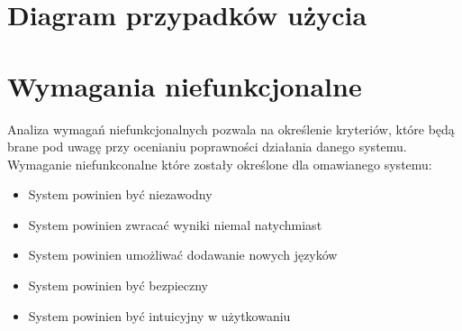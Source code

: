 \section{Diagram przypadków użycia}
\label{sec:przypadkiUzycia}
\noindent
\begin{minipage}{\linewidth}
\label{use-case}
\end{minipage}


\section{Wymagania niefunkcjonalne}
\label{sec;wymaganiaNiefunkcjonalne}
Analiza wymagań niefunkcjonalnych pozwala na określenie kryteriów, które będą brane pod uwagę przy ocenianiu poprawności działania danego systemu. \\
Wymaganie niefunkconalne które zostały określone dla omawianego systemu:
\begin{itemize}
\item System powinien być niezawodny
\item System powinien zwracać wyniki niemal natychmiast
\item System powinien umożliwać dodawanie nowych języków
\item System powinien być bezpieczny
\item System powinien być intuicyjny w użytkowaniu
\end{itemize}
